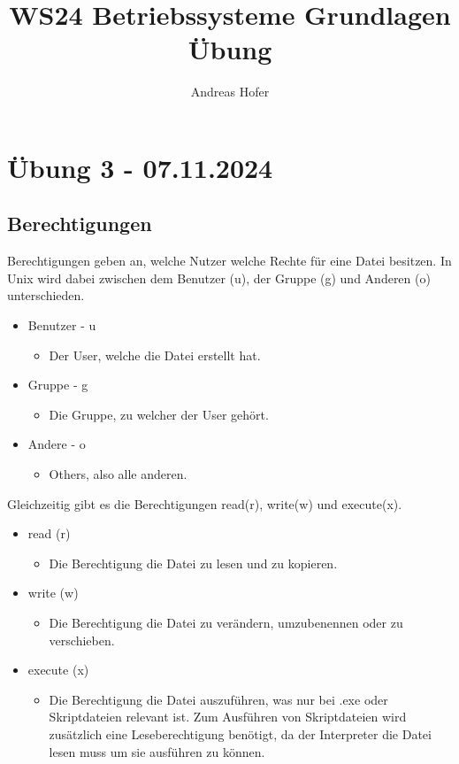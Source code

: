 \documentclass{article}
\title{\vspace{-1cm} WS24 Betriebssysteme Grundlagen Übung}
\author{Andreas Hofer}
\begin{document}
	\maketitle
	\section{Übung 3 - 07.11.2024}
	\subsection{Berechtigungen}
	Berechtigungen geben an, welche Nutzer welche Rechte für eine Datei besitzen. In Unix wird dabei zwischen dem Benutzer (u), der Gruppe (g) und Anderen (o) unterschieden.
	\begin{itemize}
		\item{Benutzer - u}
		\begin{itemize}
			\item{Der User, welche die Datei erstellt hat.}
		\end{itemize}
		\item{Gruppe - g}
		\begin{itemize}
			\item{Die Gruppe, zu welcher der User gehört.}
		\end{itemize}
		\item{Andere - o}
		\begin{itemize}
			\item{Others, also alle anderen.}
		\end{itemize}
	\end{itemize}
	Gleichzeitig gibt es die Berechtigungen read(r), write(w) und execute(x).
	\begin{itemize}
		\item{read (r)}
		\begin{itemize}
			\item{Die Berechtigung die Datei zu lesen und zu kopieren.}
		\end{itemize}
		\item{write (w)}
		\begin{itemize}
			\item{Die Berechtigung die Datei zu verändern, umzubenennen oder zu verschieben.}
		\end{itemize}
		\item{execute (x)}
		\begin{itemize}
			\item{Die Berechtigung die Datei auszuführen, was nur bei .exe oder Skriptdateien relevant ist. Zum Ausführen von Skriptdateien wird zusätzlich eine Leseberechtigung benötigt, da der Interpreter die Datei lesen muss um sie ausführen zu können.}
		\end{itemize}
	\end{itemize}
\end{document}
